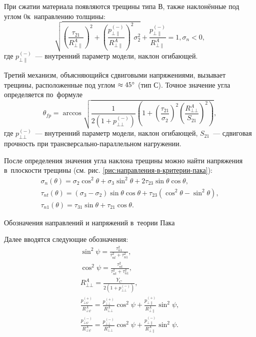 \documentclass[thesis.tex]{subfiles}
\begin{document}
При сжатии материала появляются трещины типа $В$, также наклонённые под углом 0\degree к~направлению толщины:
\begin{equation}
    \sqrt{\left( \frac{\tau_{21}}{R_{\bot\|}^A} \right)^2+
          \left( \frac{p_{\bot\|}^{(-)}}{R_{\bot\|}^A} \right)^2\sigma_2^2}+
    \frac{p_{\bot\|}^{(-)}}{R_{\bot\|}^A} = 1, \sigma_n < 0,
\end{equation}
где $p_{\bot\|}^{(-)}$~--- внутренний параметр модели, наклон огибающей.

Третий механизм, объясняющийся сдвиговыми напряжениями, вызывает трещины, расположенные под углом $\approx45\degree$
(тип $С$). Точное значение угла определяется по~формуле
\begin{equation}
    \theta_{fp} = \arccos \sqrt{\frac{1}{2\left( 1+p_{\bot\bot}^{(-)} \right)}
                                \left( 1+\left( \frac{\tau_{21}}{\sigma_2} \right)^2
                                         \left( \frac{R_{\bot\bot}^A}{S_{21}} \right)^2 \right)},
\end{equation}
где $p_{\bot\bot}^{(-)}$~--- внутренний параметр модели, наклон огибающей, $S_{21}$~--- сдвиговая прочность при
трансверсально-параллельном нагружении.

После определения значения угла наклона трещины можно найти напряжения в~плоскости трещины (см. рис.
\ref{рис:направления-в-критерии-пака}):
\begin{gather}
    \sigma_n(\theta) = \sigma_2\cos^2\theta + \sigma_3\sin^2\theta + 2\tau_{23}\sin\theta\cos\theta, \nonumber \\
    \tau_{nt}(\theta) = (\sigma_3-\sigma_2)\sin\theta\cos\theta + \tau_{23}(\cos^2\theta-\sin^2\theta), \nonumber \\
    \tau_{n1}(\theta) = \tau_{31}\sin\theta + \tau_{21}\cos\theta.
\end{gather}

    {Обозначения направлений и напряжений в~теории Пака}

Далее вводятся следующие обозначения:
\begin{gather}
    \sin^2\psi=\frac{\tau_{n1}^2}{\tau_{nt}^2+\tau_{n1}^2}, \nonumber \\
    \cos^2\psi=\frac{\tau_{nt}^2}{\tau_{nt}^2+\tau_{n1}^2}, \nonumber \\
    R_{\bot\bot}^A=\frac{Y_C}{2(1+p_{\bot\bot}^{(-)})}, \nonumber \\
    \frac{p_{\bot\psi}^{(+)}}{R_{\bot\psi}^A}=\frac{p_{\bot\bot}^{(+)}}{R_{\bot\bot}^A}\cos^2\psi+
                                              \frac{p_{\bot\|}^{(+)}}{R_{\bot\|}^A}\sin^2\psi \nonumber, \\
    \frac{p_{\bot\psi}^{(-)}}{R_{\bot\psi}^A}=\frac{p_{\bot\bot}^{(-)}}{R_{\bot\bot}^A}\cos^2\psi+
                                              \frac{p_{\bot\|}^{(-)}}{R_{\bot\|}^A}\sin^2\psi.
\end{gather}
\end{document}
